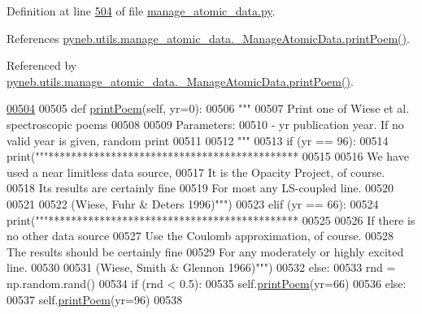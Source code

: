 Definition at line \hyperlink{manage__atomic__data_8py_source_l00504}{504} of file \hyperlink{manage__atomic__data_8py_source}{manage\-\_\-atomic\-\_\-data.\-py}.



References \hyperlink{manage__atomic__data_8py_source_l00504}{pyneb.\-utils.\-manage\-\_\-atomic\-\_\-data.\-\_\-\-Manage\-Atomic\-Data.\-print\-Poem()}.



Referenced by \hyperlink{manage__atomic__data_8py_source_l00504}{pyneb.\-utils.\-manage\-\_\-atomic\-\_\-data.\-\_\-\-Manage\-Atomic\-Data.\-print\-Poem()}.


\begin{DoxyCode}
\hypertarget{classpyneb_1_1utils_1_1manage__atomic__data_1_1___manage_atomic_data_l00504}{}\hyperlink{classpyneb_1_1utils_1_1manage__atomic__data_1_1___manage_atomic_data_a780a8f85e8acf64b44b2bce4b4292386}{00504} 
00505     \textcolor{keyword}{def }\hyperlink{classpyneb_1_1utils_1_1manage__atomic__data_1_1___manage_atomic_data_a780a8f85e8acf64b44b2bce4b4292386}{printPoem}(self, yr=0):
00506         \textcolor{stringliteral}{"""}
00507 \textcolor{stringliteral}{        Print one of Wiese et al. spectroscopic poems}
00508 \textcolor{stringliteral}{        }
00509 \textcolor{stringliteral}{        Parameters:}
00510 \textcolor{stringliteral}{            - yr     publication year. If no valid year is given, random print}
00511 \textcolor{stringliteral}{ }
00512 \textcolor{stringliteral}{        """}
00513         \textcolor{keywordflow}{if} (yr == 96):
00514             print(\textcolor{stringliteral}{"""********************************************}
00515 \textcolor{stringliteral}{            }
00516 \textcolor{stringliteral}{We have used a near limitless data source,}
00517 \textcolor{stringliteral}{It is the Opacity Project, of course.}
00518 \textcolor{stringliteral}{Its results are certainly fine}
00519 \textcolor{stringliteral}{For most any LS-coupled line.}
00520 \textcolor{stringliteral}{}
00521 \textcolor{stringliteral}{}
00522 \textcolor{stringliteral}{(Wiese, Fuhr & Deters 1996)"""})            
00523         \textcolor{keywordflow}{elif} (yr == 66):
00524             print(\textcolor{stringliteral}{"""********************************************}
00525 \textcolor{stringliteral}{}
00526 \textcolor{stringliteral}{If there is no other data source            }
00527 \textcolor{stringliteral}{Use the Coulomb approximation, of course.}
00528 \textcolor{stringliteral}{The results should be certainly fine}
00529 \textcolor{stringliteral}{For any moderately or highly excited line.}
00530 \textcolor{stringliteral}{}
00531 \textcolor{stringliteral}{(Wiese, Smith & Glennon 1966)"""})
00532         \textcolor{keywordflow}{else}:
00533             rnd = np.random.rand()
00534             \textcolor{keywordflow}{if} (rnd < 0.5):
00535                 self.\hyperlink{classpyneb_1_1utils_1_1manage__atomic__data_1_1___manage_atomic_data_a780a8f85e8acf64b44b2bce4b4292386}{printPoem}(yr=66)
00536             \textcolor{keywordflow}{else}:
00537                 self.\hyperlink{classpyneb_1_1utils_1_1manage__atomic__data_1_1___manage_atomic_data_a780a8f85e8acf64b44b2bce4b4292386}{printPoem}(yr=96)
00538 

\end{DoxyCode}
